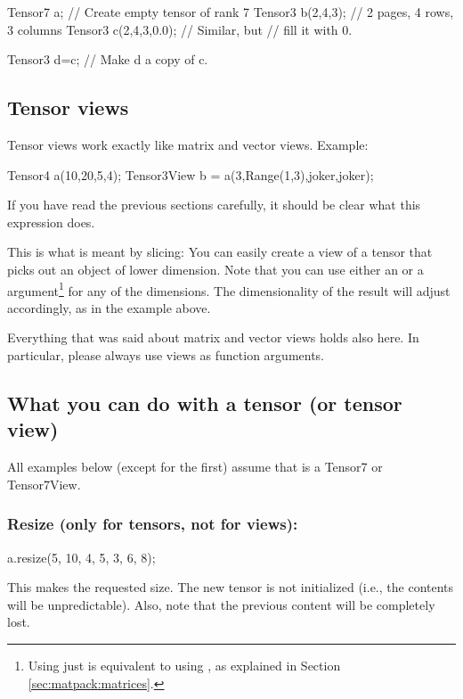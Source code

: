 \begin{code}
Tensor7 a;            // Create empty tensor of rank 7
Tensor3 b(2,4,3);     // 2 pages, 4 rows, 3 columns
Tensor3 c(2,4,3,0.0); // Similar, but
                      // fill it with 0.

Tensor3 d=c;          // Make d a copy of c.
\end{code}


\subsection{Tensor views}

Tensor views work exactly like matrix and vector views. Example:
\begin{code}
Tensor4 a(10,20,5,4);
Tensor3View b = a(3,Range(1,3),joker,joker);
\end{code}
If you have read the previous sections carefully, it should be clear
what this expression does.

This is what is meant by slicing: You can easily create a view of a
tensor that picks out an object of lower dimension. Note that you can
use either an  or a 
argument\footnote{Using just  is equivalent to using
  , as explained in Section
  \ref{sec:matpack:matrices}.} for any of the dimensions. The
dimensionality of the result will adjust accordingly, as in the
example above.

Everything that was said about matrix and vector views holds also
here. In particular, please always use views as function arguments. 

\subsection{What you can do with a tensor (or tensor view)}

All examples below (except for the first) assume that  is a
Tensor7 or Tensor7View.

\subsubsection{Resize (only for tensors, not for views):}
\begin{code}
a.resize(5, 10, 4, 5, 3, 6, 8);
\end{code}
This makes  the requested size. The new tensor is not
initialized (i.e., the contents will be unpredictable). Also, note
that the previous content will be completely lost.

